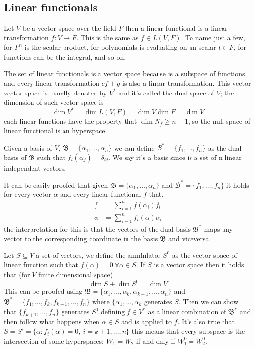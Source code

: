 \documentclass[../../../main.tex]{subfiles}
\begin{document}
\subsection{Linear functionals}
Let $V$ be a vector space over the field $F$ then a linear functional is a linear transformation $f:V\mapsto F$. This is the same as $f\in L(V,F)$. To name just a few, for $F^n$ is the scalar product, for polynomials is evaluating on an scalar $t\in F$, for functions can be the integral, and so on. 

The set of linear functionals is a vector space because is a subspace of functions and every linear transformation $cf+g$ is also a linear transformation. This vector vector space is usually denoted by $V^*$ and it's called the dual space of $V$; the dimension of such vector space is 
\begin{equation*}
    \dim V^* = \dim L(V,F)=\dim V \dim F =\dim V
\end{equation*}
each linear functions have the property that $\dim N_f\ge n-1$, so the null space of linear functional is an hyperspace.

Given a basis of $V$, $\mathfrak{B}=\{\alpha_1,\dots,\alpha_n\}$ we can define $\mathcal{B}^*=\{f_1,\dots,f_n\}$ as the dual basis of $\mathfrak{B}$ such that $f_i(\alpha_j)=\delta_{ij}$. We say it's a basis since is a set of n linear independent vectors.

It can be easily proofed that given $\mathfrak{B}=\{\alpha_1,\dots,\alpha_n\}$ and $\mathcal{B}^*=\{f_1,\dots,f_n\}$ it holds for every vector $\alpha$ and every linear functional $f$ that.
\begin{align*}
    f &= \sum_{i=1}^n f(\alpha_i)f_i\\
    \alpha &= \sum_{i=1}^n f_i(\alpha)\alpha_i
\end{align*}
the interpretation for this is that the vectors of the dual basis $\mathfrak{B}^*$ maps any vector to the corresponding coordinate in the basis $\mathfrak{B}$ and viceversa.

Let $S\subseteq V$ a set of vectors, we define the annihilator $S^0$ as the vector space of linear function such that $f(\alpha)=0\ \forall \alpha\in S$. If $S$ is a vector space then it holds that (for $V$ finite dimensional space)
\begin{equation*}
    \dim S + \dim S^0 = \dim V
\end{equation*}
This can be proofed using $\mathfrak{B}=\{\alpha_1,\dots,\alpha_k,\alpha_{k+1},\dots,\alpha_n\}$ and $\mathfrak{B}^*=\{f_1,\dots,f_k,f_{k+1},\dots,f_n\}$ where $\{\alpha_1,\dots,\alpha_k$ generates $S$. Then we can show that  $\{f_{k+1},\dots,f_n\}$ generates $S^0$ defining $f\in V^*$ as a linear combination of $\mathfrak{B}^*$ and then follow what happens when $\alpha\in S$ and is applied to $f$. It's also true that $S = S' = \{\alpha:f_i(\alpha)=0,\ i=k+1,\dots,n \}$ this means that every subspace is the intersection of some hyperspaces; $W_1=W_2$ if and only if $W_1^0=W_2^0$.
\end{document}
